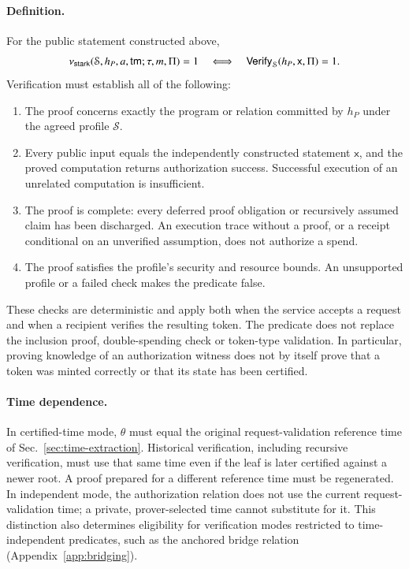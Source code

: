 \paragraph{Definition.}
For the public statement constructed above,
\[
\nu_\mathsf{stark}(\mathcal{S},h_P,a,\mathsf{tm};\tau,m,\Pi)=1
\quad\Longleftrightarrow\quad
\mathsf{Verify}_{\mathcal{S}}(h_P,\mathsf{x},\Pi)=1.
\]
Verification must establish all of the following:
\begin{enumerate}
  \item The proof concerns exactly the program or relation committed by $h_P$ under the agreed profile $\mathcal{S}$.
  \item Every public input equals the independently constructed statement $\mathsf{x}$, and the proved computation returns authorization success. Successful execution of an unrelated computation is insufficient.
  \item The proof is complete: every deferred proof obligation or recursively assumed claim has been discharged. An execution trace without a proof, or a receipt conditional on an unverified assumption, does not authorize a spend.
  \item The proof satisfies the profile's security and resource bounds. An unsupported profile or a failed check makes the predicate false.
\end{enumerate}
These checks are deterministic and apply both when the service accepts a request and when a recipient verifies the resulting token. The predicate does not replace the inclusion proof, double-spending check or token-type validation. In particular, proving knowledge of an authorization witness does not by itself prove that a token was minted correctly or that its state has been certified.

\paragraph{Time dependence.}
In certified-time mode, $\theta$ must equal the original request-validation reference time of Sec.~\ref{sec:time-extraction}. Historical verification, including recursive verification, must use that same time even if the leaf is later certified against a newer root. A proof prepared for a different reference time must be regenerated. In independent mode, the authorization relation does not use the current request-validation time; a private, prover-selected time cannot substitute for it. This distinction also determines eligibility for verification modes restricted to time-independent predicates, such as the anchored bridge relation (Appendix~\ref{app:bridging}).

